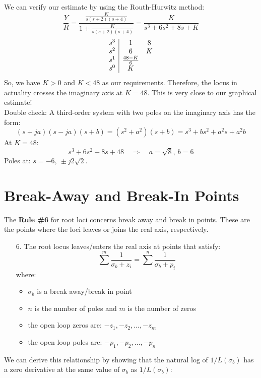 \documentclass{book}
\begin{document}
	We can verify our estimate by using the Routh-Hurwitz method:
	\[ \frac{Y}{R} = \frac{\frac{K}{s(s+2)(s+4)}}{1+\frac{K}{s(s+2)(s+4)}} = \frac{K}{s^3+6s^2+8s+K} \]
	\[ \begin{array}{c|c c}
	s^3 & 1 & 8\\
	s^2 & 6 & K\\
	s^1 & \frac{48-K}{6} & \\
	s^0 & K & \\
	\end{array} \]
	So, we have $ K>0 $ and $ K<48 $ as our requirements. Therefore, the locus in actuality crosses the imaginary axis at $ K=48 $. This is very close to our graphical estimate!\\
	
	Double check: A  third-order system with two poles on the imaginary axis has the form:
	\[ (s+ja)(s-ja)(s+b) = (s^2+a^2)(s+b) = s^3+bs^2+a^2s+a^2b \]
	At $ K=48 $:
	\[ s^3+6s^2+8s+48 \quad\Rightarrow\quad a=\sqrt{8},\ b = 6 \]
	Poles at: $ s=-6,\ \pm j2\sqrt{2} $.
	
	\section*{Break-Away and Break-In Points}
	The \textbf{Rule \#6} for root loci concerns break away and break in points. These are the points where the loci leaves or joins the real axis, respectively.
	\begin{itemize}
		\item[6.] The root locus leaves/enters the real axis at points that satisfy:
		\begin{equation}
		\sum^m \frac{1}{\sigma_b+z_i} = \sum^n \frac{1}{\sigma_b+p_i}
		\end{equation}
		where:
		\begin{itemize}
			\item $ \sigma_b $ is a break away/break in point
			\item $ n $ is the number of poles and $ m $ is the number of zeros
			\item the open loop zeros are: $ -z_1,-z_2,\ldots,-z_m $
			\item the open loop poles are: $ -p_1,-p_2,\ldots,-p_n $
		\end{itemize}
	\end{itemize}

We can derive this relationship by showing that the natural log of $ 1/L(\sigma_b) $ has a zero derivative at the same value of $ \sigma_b $ as $ 1/L(\sigma_b) $:
\end{document}
